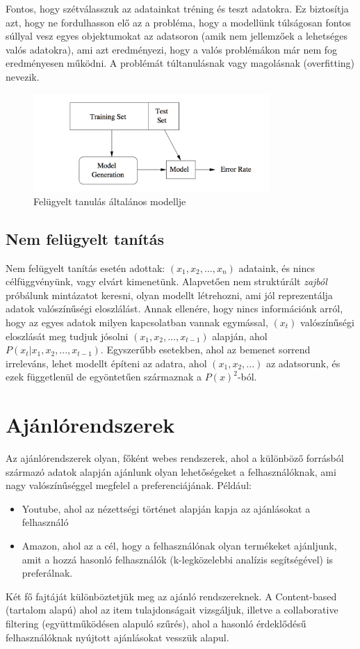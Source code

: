 \documentclass[a4paper,12pt]{article}
\begin{document}
Fontos, hogy szétválasszuk az adatainkat tréning és teszt adatokra. Ez biztosítja azt, hogy ne fordulhasson elő az a probléma, hogy a modellünk túlságosan fontos súllyal vesz egyes objektumokat az adatsoron (amik nem jellemzőek a lehetséges valós adatokra), ami azt eredményezi, hogy a valós problémákon már nem fog eredményesen működni. A problémát túltanulásnak vagy magolásnak (overfitting) nevezik. ~\cite{overfit}


\begin{figure}[ht!]
\centering
\includegraphics[width=90mm]{img/ml.png}
\caption{Felügyelt tanulás általános modellje \label{ml}}
\end{figure}

\subsection{Nem felügyelt tanítás}
Nem felügyelt tanítás esetén adottak: $(x_1, x_2, ..., x_n)$ adataink, és nincs célfüggvényünk, vagy elvárt kimenetünk. Alapvetően nem struktúrált \textsl{zajból} próbálunk mintázatot keresni, olyan modellt létrehozni, ami jól reprezentálja adatok valószínűségi eloszlálást. Annak ellenére, hogy nincs információnk arról, hogy az egyes adatok milyen kapcsolatban vannak egymással, $(x_t)$ valószínűségi eloszlását meg tudjuk jósolni  $(x_1,x_2, ..., x_{t-1})$ alapján, ahol $P(x_t|x_1,x_2, ..., x_{t-1})$.
Egyszerűbb esetekben, ahol az bemenet sorrend irreleváns, lehet modellt építeni az adatra, ahol $(x_1, x_2, ...)$ az adatsorunk, és ezek függetlenül de egyöntetűen származnak a $P(x)^2$-ból.~\cite{unsupervised}

\section{Ajánlórendszerek}
Az ajánlórendszerek olyan, főként webes rendszerek, ahol a különböző forrásból származó adatok alapján ajánlunk olyan lehetőségeket a felhasználóknak, ami nagy valószínűséggel megfelel a preferenciájának. Például:
\begin{itemize}
\item Youtube, ahol az nézettségi történet alapján kapja az ajánlásokat a felhasználó
\item Amazon, ahol az a cél, hogy a felhasználónak olyan termékeket ajánljunk, amit a hozzá hasonló felhasználók (k-legközelebbi analízis segítségével) is preferálnak. ~\cite{knearest}
\end{itemize}
Két fő fajtáját különböztetjük meg az ajánló rendszereknek. A Content-based (tartalom alapú) ahol az item tulajdonságait vizsgáljuk, illetve a collaborative filtering (együttműködésen alapuló szűrés), ahol a hasonló érdeklődésű felhasználóknak nyújtott ajánlásokat vesszük alapul. \linebreak
\end{document}
